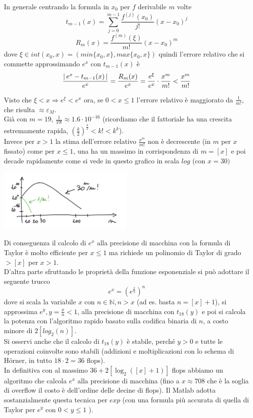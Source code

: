 \bigskip
In generale centrando la formula in $x_0$ per $f$ derivabile $m$ volte
\[t_{m-1}\left(x\right)=\sum_{j=0}^{m-1}\frac{f^{\left( j\right)}\left(x_0\right)}{j!}\left(x-x_0\right)^j\]
\[R_m\left(x\right)=\frac{f^{\left(m\right)}\left(\xi\right)}{m!}\left(x-x_0\right)^m\]
dove $\xi\in int(x_0,x)=(min\{x_0,x\},max\{x_0,x\})$ quindi l'errore relativo che si commette approssimando $e^x$ con $t_{m-1}(x)$ è
\[\frac{\lvert\,e^x-t_{m-1}(x)\,\rvert}{e^x}=\frac{R_m(x)}{e^x}=\frac{e^\xi}{e^x}\cdot\frac{x^m}{m!}
<\frac{x^m}{m!}\]

Visto che $\xi<x \Rightarrow e^\xi < e^x$ ora, se $0<x\le1$ l'errore relativo è maggiorato da $\frac{1}{m!}$, che risulta $\approx \varepsilon_M$.\\
Già con $m=19$, $\frac{1}{19!}\approx 1.6\cdot10^{-16}$ (ricordiamo che il fattoriale ha una crescita estremamente rapida, $\left(\frac{k}{2}\right)^{\frac{k}{2}}<k!<k^k$).\\
Invece per $x>1$ la stima dell'errore relativo $\frac{x^m}{m!}$ non è decrescente (in $m$ per $x$ fissato) come per $x \le 1$, una ha un massimo in corrispondenza di $m =[x]$ e poi decade rapidamente come si vede in questo grafico in scala $log$ (con $x=30)$
\begin{center}
    \includegraphics[width=0.5\textwidth]{foto/grafo1}
\end{center}
Di conseguenza il calcolo di $e^x$ alla precisione di macchina con la formula di Taylor è molto efficiente per $x \le 1$ ma richiede un polinomio di Taylor di grado $> [x]$ per $x>1$. \\
D'altra parte sfruttando le proprietà della funzione esponenziale si può adottare il seguente trucco
\[e^x = (e^{\frac{x}{n}})^n\]
dove si scala la variabile $x$ con $n \in \mathbb{N} , n > x$ (ad es. basta $n = [x]+1$), si approssima $e^y, y = \frac{x}{n}<1$, alla precisione di macchina con $t_{18}(y)$ e poi si calcola la potenza con l'algoritmo rapido basato sulla codifica binaria di $n$, a costo minore di $2[log_2(n)]$.\\
Si osservi anche che il calcolo di $t_{18} (y)$ è stabile, perché $y>0$ e tutte le operazioni coinvolte sono stabili (addizioni e moltiplicazioni con lo schema di Hörner, in tutto $18\cdot 2=36$ flops). \\
In definitiva con al massimo $36+2[ \log_2([x]+1)]$ flops abbiamo un algoritmo che calcola $e^x$ alla precisione di macchina (fino a $x \approx 708$ che è la soglia di overflow il costo è dell'ordine delle decine di flops).
Il Matlab adotta sostanzialmente questa tecnica per $exp$ (con una formula più accurata di quella di Taylor per $e^y$ con $0<y\le 1$ ).
\newpage